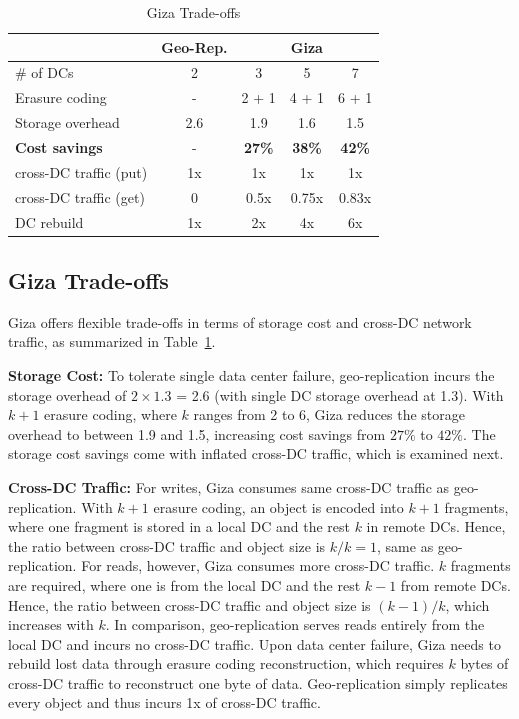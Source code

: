 \begin{table}[tp]
\centering
\footnotesize
\begin{tabular}{|l||c||c|c|c|}
\hline
											& Geo-Rep.						& \multicolumn{3}{c|}{Giza}
\\ \hline \hline
\# of DCs 						& 2										& 3 		& 5 		& 7
\\ \hline
Erasure coding 				& -										& 2 + 1	& 4 + 1	& 6 + 1
\\ \hline \hline
Storage overhead			& 2.6									& 1.9 	& 1.6 	& 1.5
\\ \hline
{\bf Cost savings}		& -										& {\bf 27\%} 	& {\bf 38\%} 	& {\bf 42\%}
\\ \hline \hline
cross-DC traffic (put)& 1x									& 1x 		& 1x 		& 1x
\\ \hline
cross-DC traffic (get)& 0										& 0.5x 	& 0.75x & 0.83x
\\ \hline
DC rebuild 						& 1x									& 2x 		& 4x 		& 6x
\\ \hline \hline
\end{tabular}
\caption{Giza Trade-offs}
\label{tab:cost_benefit}
\end{table}


\subsection{Giza Trade-offs}
\label{sec:alternative}

Giza offers flexible trade-offs in terms of storage cost and cross-DC network traffic,
as summarized in Table~\ref{tab:cost_benefit}.

{\bf Storage Cost:}
To tolerate single data center failure, geo-replication incurs the storage overhead of $2\times1.3$ = 2.6 (with single DC storage overhead at 1.3).
With $k+1$ erasure coding, where $k$ ranges from 2 to 6, Giza reduces the storage overhead to between 1.9 and 1.5, increasing cost savings from $27\%$ to $42\%$.
The storage cost savings come with inflated cross-DC traffic, which is examined next.

{\bf Cross-DC Traffic:} For writes, Giza consumes same cross-DC traffic as geo-replication. With $k+1$ erasure coding, an object is encoded into $k+1$ fragments, where one fragment is stored in a local DC and the rest $k$ in remote DCs. Hence, the ratio between cross-DC traffic and object size is $k/k = 1$, same as geo-replication.
For reads, however, Giza consumes more cross-DC traffic. $k$ fragments are required, where one is from the local DC and the rest $k-1$ from remote DCs. Hence, the ratio between cross-DC traffic and object size is $(k-1)/k$, which increases with $k$. In comparison, geo-replication serves reads entirely from the local DC and incurs no cross-DC traffic.
Upon data center failure, Giza needs to rebuild lost data through erasure coding reconstruction, which requires $k$ bytes of cross-DC traffic to reconstruct one byte of data. Geo-replication simply replicates every object and thus incurs 1x of cross-DC traffic.


